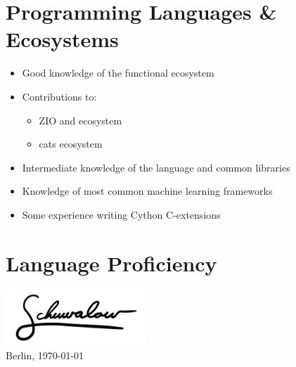 \documentclass[10pt,a4paper,sans]{moderncv}
\begin{document}
\section{Programming Languages \& Ecosystems}
 {
  \begin{itemize}
    \item Good knowledge of the functional ecosystem
    \item Contributions to:
    \begin{itemize}
        \item ZIO and ecosystem
        \item cats ecosystem
    \end{itemize}
  \end{itemize}
}
 {
  \begin{itemize}
      \item Intermediate knowledge of the language and common libraries
  \end{itemize}
}
 {
  \begin{itemize}
    \item Knowledge of most common machine learning frameworks
    \item Some experience writing Cython C-extensions
  \end{itemize}
}

\section{Language Proficiency}

\emptysection{}\closesection
\vfill
\vspace{-0.5cm}
\begin{flushright}
  \includegraphics[width=0.4\textwidth]{signature}
  ~\\
  Berlin, \today
\end{flushright}
\end{document}
